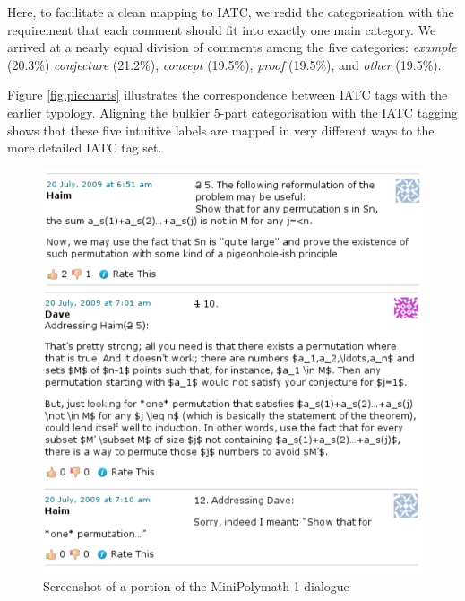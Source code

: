\documentclass[smallextended,oneside]{svjour3}       %
\newcommand\nothing[1]{#1}
\let\paragraph\nothing
\begin{document}
\paragraph{Here, to facilitate a clean mapping to IATC, we redid the categorisation with the requirement that each comment should fit into exactly one main category.}
We arrived at a nearly equal division of comments among the five categories:
\emph{example} (20.3\%) \emph{conjecture} (21.2\%),
\emph{concept} (19.5\%), \emph{proof} (19.5\%), and \emph{other}
(19.5\%).  

Figure \ref{fig:piecharts} illustrates the correspondence between IATC
tags with the earlier typology.  Aligning the bulkier 5-part
categorisation with the IATC tagging shows that these five intuitive
labels are mapped in very different ways to the more detailed IATC tag
set.

\begin{figure}
\begin{center}
\includegraphics[width=.62\textwidth]{sample-minipolymath-comments}
\end{center}
\caption{Screenshot of a portion of the MiniPolymath 1 dialogue\label{fig:running-example-introduced}}
\end{figure}
\end{document}
